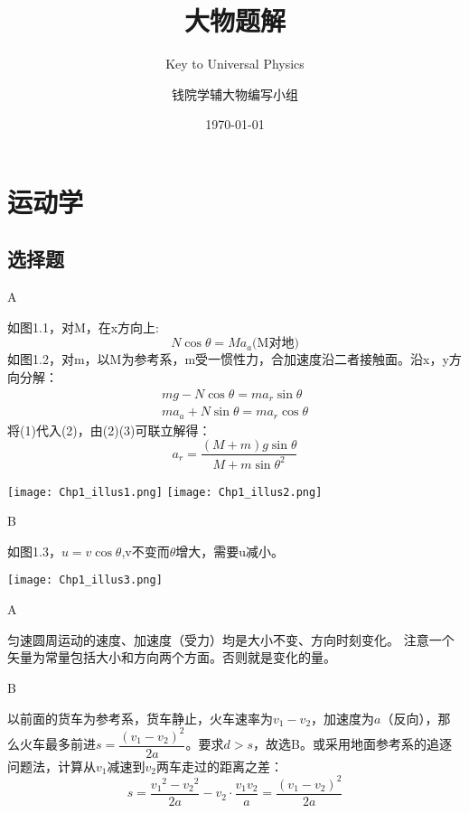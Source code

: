 \documentclass[b5paper,opensource]{./template/qyxf-book}
\title{大物题解}
\subtitle{Key to Universal Physics}
\author{钱院学辅大物编写小组}
\date{\today}
\begin{document}
\maketitle 
\tableofcontents

\chapter{运动学}  %
\section{选择题}  %

A  %

\solve  %
如图1.1，对M，在x方向上:
\begin{equation*} %
N\cos\theta=Ma_a\text{(M对地)}
\end{equation*}
如图1.2，对m，以M为参考系，m受一惯性力，合加速度沿二者接触面。沿x，y方向分解： %
\begin{gather}
mg-N\cos\theta=ma_r\sin\theta \\
ma_a+N\sin\theta=ma_r\cos\theta
\end{gather}
将(1)代入(2)，由(2)(3)可联立解得：
\[
a_r=\dfrac{(M+m)g\sin\theta}{M+m{\sin\theta}^2}
\]

\centerline{\texttt{[image: Chp1\_illus1.png]}  %
\quad\texttt{[image: Chp1\_illus2.png]}}

B

\solve 如图1.3，$u=v\cos\theta$,v不变而$\theta$增大，需要u减小。
\centerline{\texttt{[image: Chp1\_illus3.png]}}

A

\solve 匀速圆周运动的速度、加速度（受力）均是大小不变、方向时刻变化。
注意一个矢量为常量包括大小和方向两个方面。否则就是变化的量。

B

\solve 以前面的货车为参考系，货车静止，火车速率为$v_1-v_2$，加速度为$a$（反向），那么火车最多前进$s=\dfrac{{(v_1-v_2)}^2}{2a}$。要求$d>s$，故选B。或采用地面参考系的追逐问题法，计算从$v_1$减速到$v_2$两车走过的距离之差：
\[
s=\dfrac{{v_1}^2-{v_2}^2}{2a}-v_2\cdot \dfrac{v_1v_2}{a}=\dfrac{{(v_1-v_2)}^2}{2a}
\]
\end{document}
